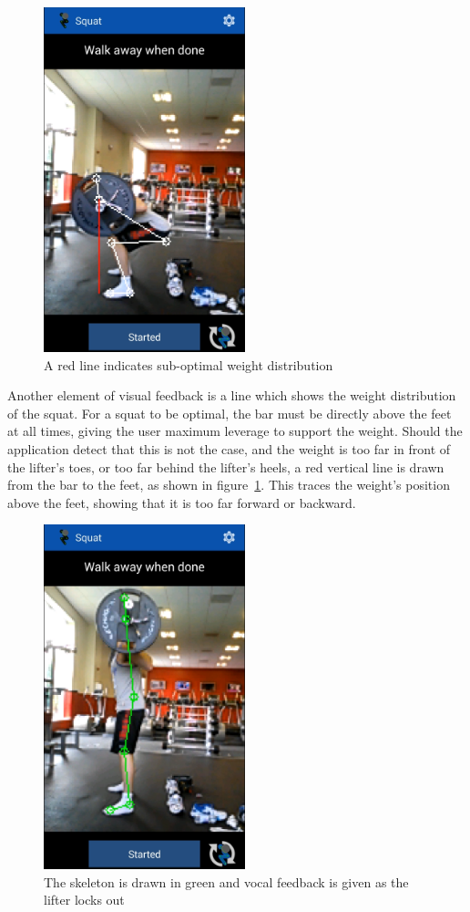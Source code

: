 \begin{figure}[H]
    \centering
	\includegraphics[height=10cm]{application/images/weightdistro}
\caption{A red line indicates sub-optimal weight distribution}
\label{fig:weightdistro}
\end{figure}

Another element of visual feedback is a line which shows the weight distribution of the squat. For a squat to be optimal, the bar must be directly above the feet at all times, giving the user maximum leverage to support the weight. Should the application detect that this is not the case, and the weight is too far in front of the lifter's toes, or too far behind the lifter's heels, a red vertical line is drawn from the bar to the feet, as shown in figure~\ref{fig:weightdistro}. This traces the weight's position above the feet, showing that it is too far forward or backward.

\begin{figure}[H]
    \centering
	\includegraphics[height=10cm]{application/images/lockout}
\caption{The skeleton is drawn in green and vocal feedback is given as the lifter locks out}
\label{fig:lockout}
\end{figure}

